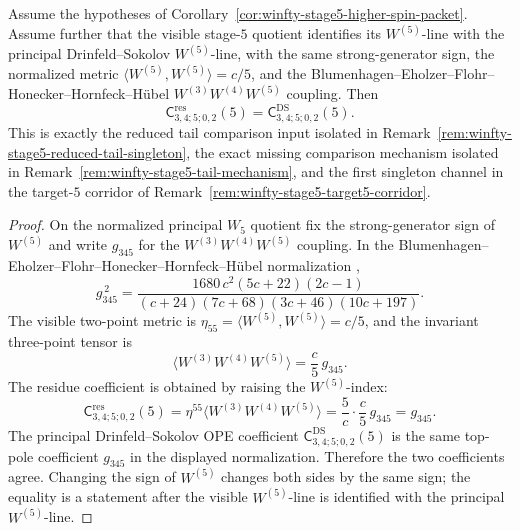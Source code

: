 \begin{proposition}
\label{prop:winfty-stage5-block-34}
\ClaimStatusConditional{}
Assume the hypotheses of
Corollary~\ref{cor:winfty-stage5-higher-spin-packet}. Assume further
that the visible stage-$5$ quotient identifies its \(W^{(5)}\)-line
with the principal Drinfeld--Sokolov \(W^{(5)}\)-line, with the same
strong-generator sign, the normalized metric
\(\langle W^{(5)},W^{(5)}\rangle=c/5\), and the
Blumenhagen--Eholzer--Flohr--Honecker--Hornfeck--H\"ubel
\(W^{(3)}W^{(4)}W^{(5)}\) coupling. Then
\[
\mathsf{C}^{\mathrm{res}}_{3,4;5;0,2}(5)
=
\mathsf{C}^{\mathrm{DS}}_{3,4;5;0,2}(5).
\]
This is exactly the reduced tail comparison input isolated in
Remark~\ref{rem:winfty-stage5-reduced-tail-singleton}, the exact
missing comparison mechanism isolated in
Remark~\ref{rem:winfty-stage5-tail-mechanism}, and the
first singleton channel in the target-$5$ corridor of
Remark~\ref{rem:winfty-stage5-target5-corridor}.
\end{proposition}

\begin{proof}
On the normalized principal \(W_5\) quotient fix the strong-generator
sign of \(W^{(5)}\) and write \(g_{345}\) for the
\(W^{(3)}W^{(4)}W^{(5)}\) coupling. In the
Blumenhagen--Eholzer--Flohr--Honecker--Hornfeck--H\"ubel
normalization \cite{BEHFH96},
\[
g_{345}^{\,2}
=
\frac{1680\,c^2(5c+22)(2c-1)}
{(c+24)(7c+68)(3c+46)(10c+197)} .
\]
The visible two-point metric is
\(\eta_{55}=\langle W^{(5)},W^{(5)}\rangle=c/5\), and the invariant
three-point tensor is
\[
\langle W^{(3)}W^{(4)}W^{(5)}\rangle
=
\frac{c}{5}\,g_{345}.
\]
The residue coefficient is obtained by raising the \(W^{(5)}\)-index:
\[
\mathsf{C}^{\mathrm{res}}_{3,4;5;0,2}(5)
=
\eta^{55}\langle W^{(3)}W^{(4)}W^{(5)}\rangle
=
\frac{5}{c}\cdot\frac{c}{5}\,g_{345}
=g_{345}.
\]
The principal Drinfeld--Sokolov OPE coefficient
\(\mathsf{C}^{\mathrm{DS}}_{3,4;5;0,2}(5)\) is the same top-pole
coefficient \(g_{345}\) in the displayed normalization. Therefore the
two coefficients agree. Changing the sign of \(W^{(5)}\) changes both
sides by the same sign; the equality is a statement after the visible
\(W^{(5)}\)-line is identified with the principal \(W^{(5)}\)-line.
\end{proof}

